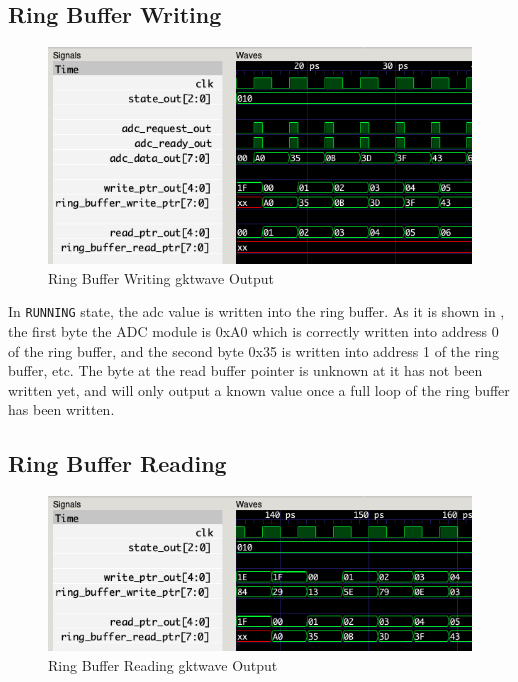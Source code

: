 \subsection{Ring Buffer Writing}\label{subsec:ring-buffer-writing}
\begin{figure}[H]
    \centering
    \includegraphics[width=\columnwidth]{Figures/Badc_ring_buffer_write}
    \caption{Ring Buffer Writing gktwave Output}
    \label{fig:testB}
\end{figure}

In \texttt{RUNNING} state, the adc value is written into the ring buffer.
As it is shown in , the first byte the ADC module is 0xA0 which is correctly written into address 0 of the ring buffer, and the second byte 0x35 is written into address 1 of the ring buffer, etc.
The byte at the read buffer pointer is unknown at it has not been written yet, and will only output a known value once a full loop of the ring buffer has been written.

\subsection{Ring Buffer Reading}
\begin{figure}[H]
    \centering
    \includegraphics[width=\columnwidth]{Figures/Cadc_ring_buffer_read}
    \caption{Ring Buffer Reading gktwave Output}
    \label{fig:testC}
\end{figure}

